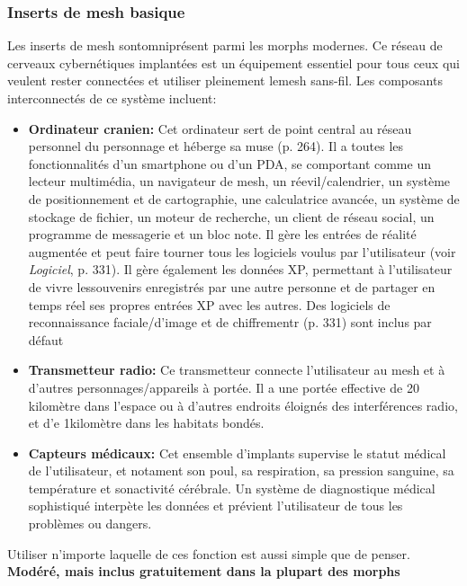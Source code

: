 \subsubsection{Inserts de mesh basique} 

Les inserts de mesh sontomniprésent parmi les morphs modernes. Ce réseau de cerveaux cybernétiques implantées est un équipement essentiel pour tous ceux qui veulent rester connectées et utiliser pleinement lemesh sans-fil. Les composants interconnectés de ce système incluent: 

\begin{itemize} \item \textbf{Ordinateur cranien:} Cet ordinateur sert de point central au réseau personnel du personnage et héberge sa muse (p. 264). Il a toutes les fonctionnalités d'un smartphone ou d'un PDA, se comportant comme un lecteur multimédia, un navigateur de mesh, un réevil/calendrier, un système de positionnement et de cartographie, une calculatrice avancée, un système de stockage de fichier, un moteur de recherche, un client de réseau social, un programme de messagerie et un bloc note. Il gère les entrées de réalité augmentée et peut faire tourner tous les logiciels voulus par l'utilisateur (voir \emph{Logiciel}, p. 331). Il gère également les données XP, permettant à l'utilisateur de vivre lessouvenirs enregistrés par une autre personne et de partager en temps réel ses propres entrées XP avec les autres. Des logiciels de reconnaissance faciale/d'image et de chiffrementr (p. 331) sont inclus par défaut \item \textbf{Transmetteur radio:} Ce transmetteur connecte l'utilisateur au mesh et à d'autres personnages/appareils à portée. Il a une portée effective de 20 kilomètre dans l'espace ou à d'autres endroits éloignés des interférences radio, et d'e 1kilomètre dans les habitats bondés. \item \textbf{Capteurs médicaux:} Cet ensemble d'implants supervise le statut médical de l'utilisateur, et notament son poul, sa respiration, sa pression sanguine, sa température et sonactivité cérébrale. Un système de diagnostique médical sophistiqué interpète les données et prévient l'utilisateur de tous les problèmes ou dangers. \end{itemize} 

Utiliser n'importe laquelle de ces fonction est aussi simple que de penser. \textbf{{Modéré, mais inclus gratuitement dans la plupart des morphs}} 

